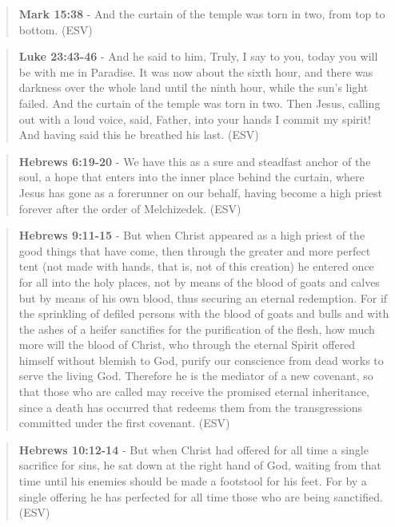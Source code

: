 \documentclass[11pt]{article}
\begin{document}
\begin{quote}
\textbf{Mark 15:38} - And the curtain of the temple was torn in two, from top to bottom. (ESV)
\end{quote}

\begin{quote}
\textbf{Luke 23:43-46} - And he said to him, Truly, I say to you, today you will be with me in Paradise. It was now about the sixth hour, and there was darkness over the whole land until the ninth hour, while the sun's light failed. And the curtain of the temple was torn in two. Then Jesus, calling out with a loud voice, said, Father, into your hands I commit my spirit! And having said this he breathed his last. (ESV)
\end{quote}

\begin{quote}
\textbf{Hebrews 6:19-20} - We have this as a sure and steadfast anchor of the soul, a hope that enters into the inner place behind the curtain, where Jesus has gone as a forerunner on our behalf, having become a high priest forever after the order of Melchizedek. (ESV)
\end{quote}

\begin{quote}
\textbf{Hebrews 9:11-15} - But when Christ appeared as a high priest of the good things that have come, then through the greater and more perfect tent (not made with hands, that is, not of this creation) he entered once for all into the holy places, not by means of the blood of goats and calves but by means of his own blood, thus securing an eternal redemption. For if the sprinkling of defiled persons with the blood of goats and bulls and with the ashes of a heifer sanctifies for the purification of the flesh, how much more will the blood of Christ, who through the eternal Spirit offered himself without blemish to God, purify our conscience from dead works to serve the living God. Therefore he is the mediator of a new covenant, so that those who are called may receive the promised eternal inheritance, since a death has occurred that redeems them from the transgressions committed under the first covenant. (ESV)
\end{quote}

\begin{quote}
\textbf{Hebrews 10:12-14} - But when Christ had offered for all time a single sacrifice for sins, he sat down at the right hand of God, waiting from that time until his enemies should be made a footstool for his feet. For by a single offering he has perfected for all time those who are being sanctified. (ESV)
\end{quote}
\end{document}
